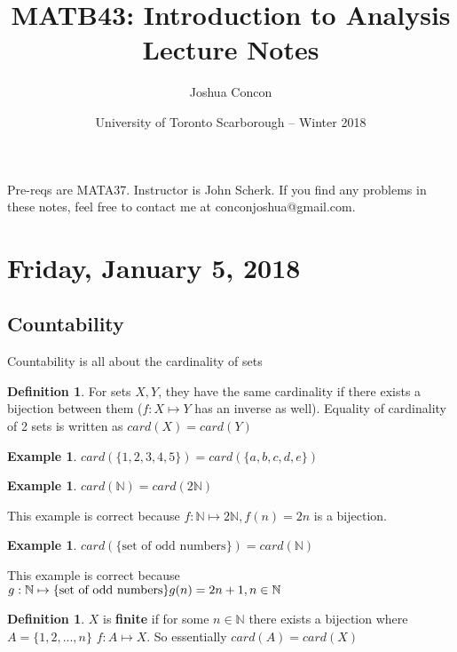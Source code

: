 \documentclass[12pt]{article}
\theoremstyle{plain}
\theoremstyle{definition}
\newtheorem{definition}[theorem]{Definition}
\newtheorem{example}[theorem]{Example}
\begin{document}
\title{MATB43: Introduction to Analysis\\ Lecture Notes}
\date{University of Toronto Scarborough -- Winter 2018}
\author{Joshua Concon}
\maketitle
Pre-reqs are MATA37. Instructor is John Scherk. If you find any problems in these notes, feel free to contact me at conconjoshua@gmail.com.

\tableofcontents

\pagebreak

\section{Friday, January 5, 2018}

\subsection{Countability}

Countability is all about the cardinality of sets

\begin{definition}
	For sets $X,Y$, they have the same cardinality if there exists a bijection between them ($f:X\mapsto Y$ has an inverse as well). Equality of cardinality of 2 sets is written as $card(X) = card(Y)$
\end{definition}

\begin{example}
	$card(\{ 1,2,3,4,5 \}) = card(\{ a,b,c,d,e \}) $
\end{example}
\begin{example}
	$card(\mathbb{N}) = card(2\mathbb{N})$
\end{example}

This example is correct because $f:\mathbb{N} \mapsto 2\mathbb{N}, f(n)=2n$ is a bijection.

\begin{example}
	$card(\{\text{set of odd numbers}\}) = card(\mathbb{N})$
\end{example}

This example is correct because $g:\mathbb{N} \mapsto \{\text{set of odd numbers}\}\\ g(n)=2n+1, n\in\mathbb{N}$

\begin{definition}
	$X$ is \textbf{finite} if for some $n\in\mathbb{N}$ there exists a bijection where $A=\{ 1,2,...,n \}$ $f:A\mapsto X$. So essentially $card(A) = card(X)$
\end{definition}
\end{document}
